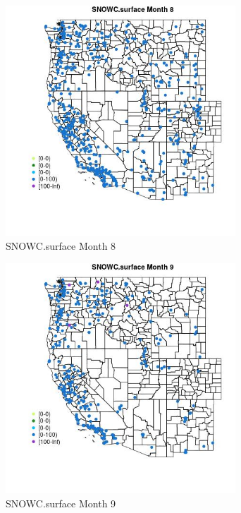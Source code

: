 \begin{figure} 
\centering  
\includegraphics[width=0.77\textwidth]{Code_Outputs/Report_ML_input_PM25_Step4_part_e_de_duplicated_aves_compiled_2019-05-18wNAs_MapObsMo8SNOWCsurface.jpg} 
\caption{\label{fig:Report_ML_input_PM25_Step4_part_e_de_duplicated_aves_compiled_2019-05-18wNAsMapObsMo8SNOWCsurface}SNOWC.surface Month 8} 
\end{figure} 
 

\begin{figure} 
\centering  
\includegraphics[width=0.77\textwidth]{Code_Outputs/Report_ML_input_PM25_Step4_part_e_de_duplicated_aves_compiled_2019-05-18wNAs_MapObsMo9SNOWCsurface.jpg} 
\caption{\label{fig:Report_ML_input_PM25_Step4_part_e_de_duplicated_aves_compiled_2019-05-18wNAsMapObsMo9SNOWCsurface}SNOWC.surface Month 9} 
\end{figure} 
 

